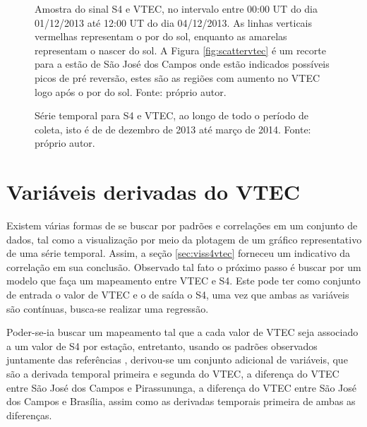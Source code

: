 \begin{figure}[H]
\centering
{}
\caption{Amostra do sinal S4 e VTEC, no intervalo entre 00:00 UT do dia 01/12/2013 até 12:00 UT do dia 04/12/2013. As linhas verticais vermelhas representam o por do sol, enquanto as amarelas representam o nascer do sol. A Figura \ref{fig:scattervtec} é um recorte para a estão de São José dos Campos onde estão indicados possíveis picos de pré reversão, estes são as regiões com aumento no VTEC logo após o por do sol. Fonte: próprio autor.}
\label{fig:s4vtecsample}
\end{figure}

\begin{figure}[H]
\centering
{}
\caption{Série temporal para S4 e VTEC, ao longo de todo o período de coleta, isto é de de dezembro de 2013 até março de 2014. Fonte: próprio autor.}
\label{fig:s4vteccomplete}
\end{figure}

\section{Variáveis derivadas do VTEC}\label{sec:vdt}

Existem várias formas de se buscar por padrões e correlações em um conjunto de dados, tal como a visualização por meio da plotagem de um gráfico representativo de uma série temporal. Assim, a seção \ref{sec:viss4vtec} forneceu um indicativo da correlação em sua conclusão. Observado tal fato o próximo passo é buscar por um modelo que faça um mapeamento entre VTEC e S4. Este pode ter como conjunto de entrada o valor de VTEC e o de saída o S4, uma vez que ambas as variáveis são contínuas, busca-se realizar uma regressão. 

Poder-se-ia buscar um mapeamento tal que a cada valor de VTEC seja associado a um valor de S4 por estação, entretanto, usando os padrões observados juntamente das referências \cite{RAGHUNATH:2016, RAGHAVARAO:1998,RAY:2006}, derivou-se um conjunto adicional de variáveis, que são a derivada temporal primeira e segunda do VTEC, a diferença do VTEC entre São José dos Campos e Pirassununga, a diferença do VTEC entre São José dos Campos e Brasília, assim como as derivadas temporais primeira de ambas as diferenças. 


